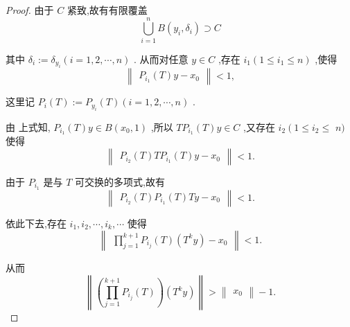 \documentclass[lang=cn,newtx,10pt,scheme=chinese,thmcnt=chapter]{elegantbook}
\begin{document}
\begin{proof}
由于 \(C\) 紧致,故有有限覆盖
\begin{equation*}
\mathop{\bigcup }\limits_{{i = 1}}^{n}B\left( {{y}_{i},{\delta }_{i}}\right)  \supset  C
\end{equation*}

其中 \({\delta }_{i} \mathrel{\text{ := }} {\delta }_{{y}_{i}}\left( {i = 1,2,\cdots ,n}\right)\) . 从而对任意 \(y \in  C\) ,存在 \({i}_{1}\left( {1 \leqslant  {i}_{1} \leqslant  n}\right)\) ,使得
\begin{equation}
\begin{Vmatrix}{{P}_{{i}_{1}}\left( T\right) y - {x}_{0}}\end{Vmatrix} < 1, \label{4.14}
\end{equation}

这里记 \({P}_{i}\left( T\right)  \mathrel{\text{ := }} {P}_{{y}_{i}}\left( T\right) \left( {i = 1,2,\cdots ,n}\right)\) .

由 上式知, \({P}_{{i}_{1}}\left( T\right) y \in  B\left( {{x}_{0},1}\right)\) ,所以 \(T{P}_{{i}_{1}}\left( T\right) y \in  C\) ,又存在 \({i}_{2}\left( {1 \leqslant  {i}_{2} \leqslant  }\right.\)  \(n)\) 使得
\begin{equation*}
\begin{Vmatrix}{{P}_{{i}_{2}}\left( T\right) T{P}_{{i}_{1}}\left( T\right) y - {x}_{0}}\end{Vmatrix} < 1.
\end{equation*}

由于 \({P}_{{i}_{1}}\) 是与 \(T\) 可交换的多项式,故有
\begin{equation*}
\begin{Vmatrix}{{P}_{{i}_{2}}\left( T\right) {P}_{{i}_{1}}\left( T\right) {Ty} - {x}_{0}}\end{Vmatrix} < 1.
\end{equation*}

依此下去,存在 \({i}_{1},{i}_{2},\cdots ,{i}_{k},\cdots\) 使得
\begin{equation*}
\begin{Vmatrix}{\mathop{\prod }\limits_{{j = 1}}^{{k + 1}}{P}_{{i}_{j}}\left( T\right) \left( {{T}^{k}y}\right)  - {x}_{0}}\end{Vmatrix} < 1.
\end{equation*}

从而
\begin{equation*}
\left\|\left( {\mathop{\prod }\limits_{{j = 1}}^{{k + 1}}{P}_{{i}_{j}}\left( T\right) }\right)\left( {{T}^{k}y}\right) \right\|> \begin{Vmatrix}{x}_{0}\end{Vmatrix} - 1.
\end{equation*}


\end{proof}
\end{document}
